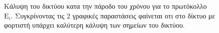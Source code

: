 \begin{figure}[H]
  \centering
  \caption{Κάλυψη του δικτύου κατα την πάροδο του χρόνου για το πρωτόκολλο $\text{E}_{i}$. Συγκρίνοντας τις 2 γραφικές παραστάσεις φαίνεται οτι στο δίκτυο με φορτιστή
υπάρχει καλύτερη κάλυψη των σημείων του δικτύου.}
  \label{fig:5_1exp_3_3}
\end{figure}





